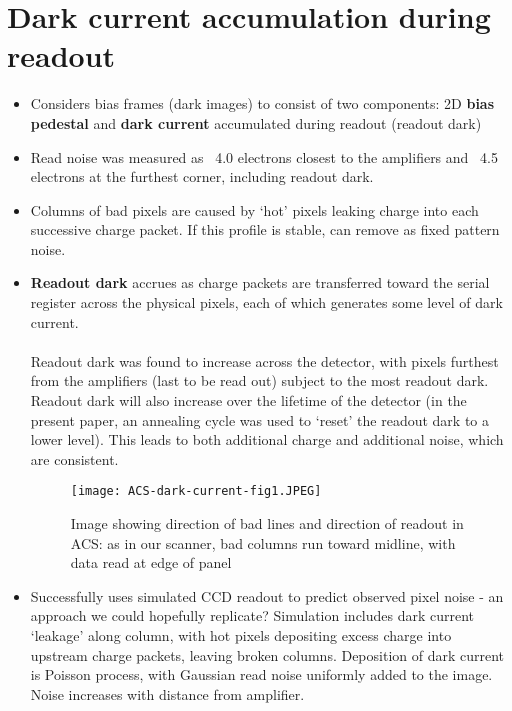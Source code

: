 \documentclass[10pt,fleqn]{article}
\begin{document}
\section{Dark current accumulation during readout \cite{readoutDark2014}}

\begin{itemize}

\item Considers bias frames (dark images) to consist of two components: 2D \textbf{bias pedestal} and \textbf{dark current} accumulated during readout (readout dark) 

\item Read noise was measured as ~4.0 electrons closest to the amplifiers and ~4.5 electrons at the furthest corner, including readout dark. 

\item Columns of bad pixels are caused by `hot' pixels leaking charge into each successive charge packet. If this profile is stable, can remove as fixed pattern noise.

\item \textbf{Readout dark} accrues as charge packets are transferred toward the serial register across the physical pixels, each of which generates some level of dark current.
\\
\\
Readout dark was found to increase across the detector, with pixels furthest from the amplifiers (last to be read out) subject to the most readout dark. Readout dark will also increase over the lifetime of the detector (in the present paper, an annealing cycle was used to `reset' the readout dark to a lower level). This leads to both additional charge and additional noise, which are consistent.

\begin{figure}[!h]
\caption{Image showing direction of bad lines and direction of readout in ACS: as in our scanner, bad columns run toward midline, with data read at edge of panel}
\centering
\texttt{[image: ACS-dark-current-fig1.JPEG]}
\end{figure}

\item Successfully uses simulated CCD readout to predict observed pixel noise - an approach we could hopefully replicate? Simulation includes dark current `leakage' along column, with hot pixels depositing excess charge into upstream charge packets, leaving broken columns. Deposition of dark current is Poisson process, with Gaussian read noise uniformly added to the image. Noise increases with distance from amplifier. 


\end{itemize}
\end{document}
